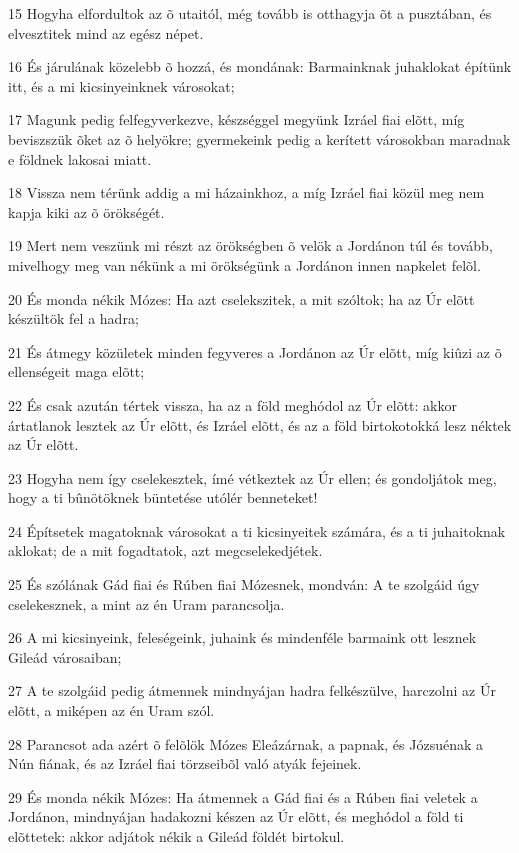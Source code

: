 \par 15 Hogyha elfordultok az õ utaitól, még tovább is otthagyja õt a pusztában, és elvesztitek mind az egész népet.
\par 16 És járulának közelebb õ hozzá, és mondának: Barmainknak juhaklokat építünk itt, és a mi kicsinyeinknek városokat;
\par 17 Magunk pedig felfegyverkezve, készséggel megyünk Izráel fiai elõtt, míg beviszszük õket az õ helyökre; gyermekeink pedig a kerített városokban maradnak e  földnek lakosai miatt.
\par 18 Vissza nem térünk addig a mi házainkhoz, a míg Izráel fiai közül meg nem kapja kiki az õ örökségét.
\par 19 Mert nem veszünk mi részt az örökségben õ velök a Jordánon túl és tovább, mivelhogy meg van nékünk a mi örökségünk a Jordánon innen napkelet felõl.
\par 20 És monda nékik Mózes: Ha azt cselekszitek, a mit szóltok; ha az Úr elõtt készültök fel a hadra;
\par 21 És átmegy közületek minden fegyveres a Jordánon az Úr elõtt, míg kiûzi az õ ellenségeit maga elõtt;
\par 22 És csak azután tértek vissza, ha az a föld meghódol az Úr elõtt: akkor ártatlanok lesztek az Úr elõtt, és Izráel elõtt, és az a föld birtokotokká lesz néktek az Úr elõtt.
\par 23 Hogyha nem így cselekesztek, ímé vétkeztek az Úr ellen; és gondoljátok meg, hogy a ti bûnötöknek büntetése utólér benneteket!
\par 24 Építsetek magatoknak városokat a ti kicsinyeitek számára, és a ti juhaitoknak aklokat; de a mit fogadtatok, azt megcselekedjétek.
\par 25 És szólának Gád fiai és Rúben fiai Mózesnek, mondván: A te szolgáid úgy cselekesznek, a mint az én Uram parancsolja.
\par 26 A mi kicsinyeink, feleségeink, juhaink és mindenféle barmaink ott lesznek Gileád városaiban;
\par 27 A te szolgáid pedig átmennek mindnyájan hadra felkészülve, harczolni az Úr elõtt, a miképen az én Uram szól.
\par 28 Parancsot ada azért õ felõlök Mózes Eleázárnak, a papnak, és Józsuénak a Nún fiának, és az Izráel fiai törzseibõl való atyák fejeinek.
\par 29 És monda nékik Mózes: Ha átmennek a Gád fiai és a Rúben fiai veletek a Jordánon, mindnyájan hadakozni készen az Úr elõtt, és meghódol a föld ti elõttetek: akkor adjátok nékik a Gileád földét birtokul.

